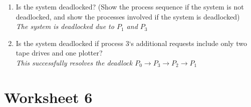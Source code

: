 \documentclass{article}
\newcommand{\answercolor}{Bittersweet}
\newcommand{\answer}[1]{{\\\color{\answercolor}\footnotesize\itshape{#1}}}
\begin{document}
\begin{enumerate}
\begin{itemize}
		\end{itemize}
		\begin{enumerate}
			\item Is the system deadlocked? (Show the process sequence if the system is not deadlocked, and show the processes involved if the system is deadlocked)
			\answer{The system is deadlocked due to $P_1$ and $P_3$}
			\item Is the system deadlocked if process 3‘s additional requests include only two tape drives and one plotter?
			\answer {This successfully resolves the deadlock $P_0 \rightarrow P_3 \rightarrow P_2 \rightarrow P_1$}
		\end{enumerate}
	\end{enumerate}
	\section{Worksheet 6}
\end{document}
